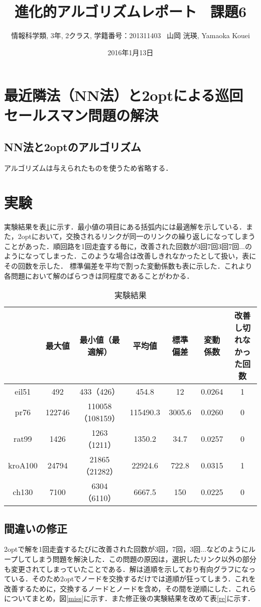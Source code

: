 \documentclass[a4j]{jarticle}
\title{進化的アルゴリズムレポート \ 課題6}
\author{情報科学類, 3年, 2クラス, 学籍番号：201311403 \ 山岡 洸瑛, Yamaoka
Kouei}
\date{2016年1月13日}
\begin{document}
\maketitle
\section*{最近隣法（NN法）と2optによる巡回セールスマン問題の解決}
\subsection*{NN法と2optのアルゴリズム}
アルゴリズムは与えられたものを使うため省略する．
\section*{実験}
実験結果を表\ref{result}に示す．最小値の項目にある括弧内には最適解を示している．また，2optにおいて，交換されるリンクが同一のリンクの繰り返しになってしまうことがあった．順回路を1回走査する毎に，改善された回数が3回7回3回7回...のようになってしまった．このような場合は改善しきれなかったとして扱い，表にその回数を示した．
標準偏差を平均で割った変動係数も表に示した．これより各問題において解のばらつきは同程度であることがわかる．
\begin{table}[H]
 \begin{center}
  \caption{実験結果}
  \label{result}
  \begin{tabular}[tb]{|c|c|c|c|c|c|c|} \hline
   & 最大値 & 最小値（最適解） & 平均値 & 標準偏差 & 変動係数 & 改善し切れなかった回数 \\ \hline
   eil51 & 492 & 433（426） & 454.8 & 12 & 0.0264 & 1 \\ \hline
   pr76 & 122746 & 110058（108159） & 115490.3 & 3005.6 & 0.0260 & 0 \\ \hline
   rat99 & 1426 & 1263（1211） & 1350.2 & 34.7 & 0.0257 & 0 \\ \hline
   kroA100 & 24794 & 21865（21282） & 22924.6 & 722.8 & 0.0315 & 1 \\ \hline
   ch130 & 7100 & 6304（6110） & 6667.5 & 150 & 0.0225 & 0 \\ \hline
  \end{tabular}
 \end{center}
\end{table}

\subsection*{間違いの修正}
2optで解を1回走査するたびに改善された回数が3回，7回，3回...などのようにループしてしまう問題を解決した．この問題の原因は，選択したリンク以外の部分も変更されてしまっていたことである．解は道順を示しており有向グラフになっている．そのため2optでノードを交換するだけでは道順が狂ってしまう．これを改善するために，交換するノードとノードを含め，その間を逆順にした．これらについてまとめ，図\ref{miss}に示す．また修正後の実験結果を改めて表\ref{re}に示す．
\end{document}
